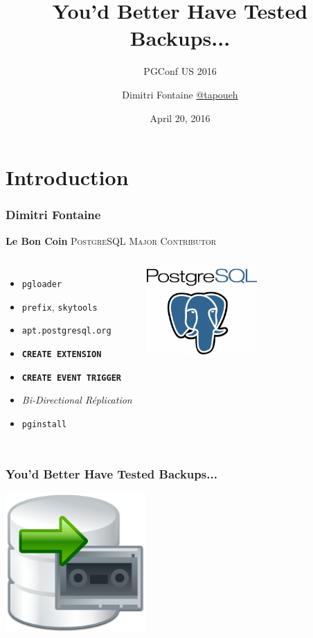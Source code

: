 \documentclass{beamer}
\title{You'd Better Have Tested Backups...}
\subtitle{PGConf US 2016}
\author{Dimitri Fontaine \url{@tapoueh}}
\date{April 20, 2016}
\begin{document}
\frame{\titlepage}

\section{Introduction}

\begin{frame}[fragile]
  \frametitle{Dimitri Fontaine}

  \begin{center}
    \textbf{Le Bon Coin}
    \vfill
    {\Large \textsc{PostgreSQL Major Contributor}}
  \end{center}

\begin{columns}[c]

  \begin{itemize}
   \item \texttt{pgloader}
   \item \texttt{prefix}, \texttt{skytools}
   \item \texttt{apt.postgresql.org}
   \item \texttt{\textbf{CREATE EXTENSION}}
   \item \texttt{\textbf{CREATE EVENT TRIGGER}}
   \item \textit{Bi-Directional Réplication}
   \item \texttt{pginstall}
  \end{itemize}  

\begin{center}
  \includegraphics[height=9em]{postgres-logo.png}
\end{center}
\end{columns}
\end{frame}

\begin{frame}
  \frametitle{You'd Better Have Tested Backups...}

  \begin{center}
    \includegraphics[height=2.1in]{backup-review.png}
  \end{center}
\end{frame}
\end{document}
